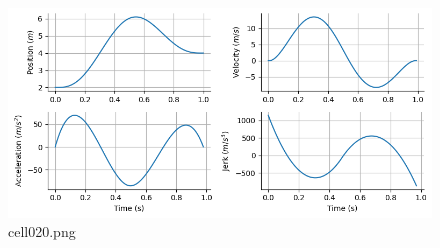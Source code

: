 \begin{figure}[ht]
	\centering
	\includegraphics[scale=0.8, max width=\linewidth]{./fig/motor-learning/minimum-jerk/cell020.png}
	\caption{cell020.png}
	\label{cell020.png}
\end{figure}